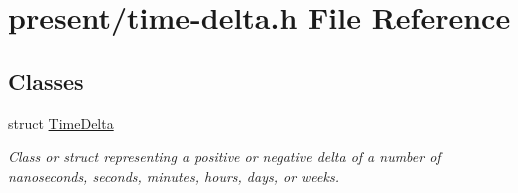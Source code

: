 \hypertarget{time-delta_8h}{\section{present/time-\/delta.h File Reference}
\label{time-delta_8h}
}
\subsection*{Classes}
\begin{DoxyCompactItemize}
\item 
struct \hyperlink{structTimeDelta}{Time\-Delta}
\begin{DoxyCompactList}\small\item\em Class or struct representing a positive or negative delta of a number of nanoseconds, seconds, minutes, hours, days, or weeks. \end{DoxyCompactList}\end{DoxyCompactItemize}
